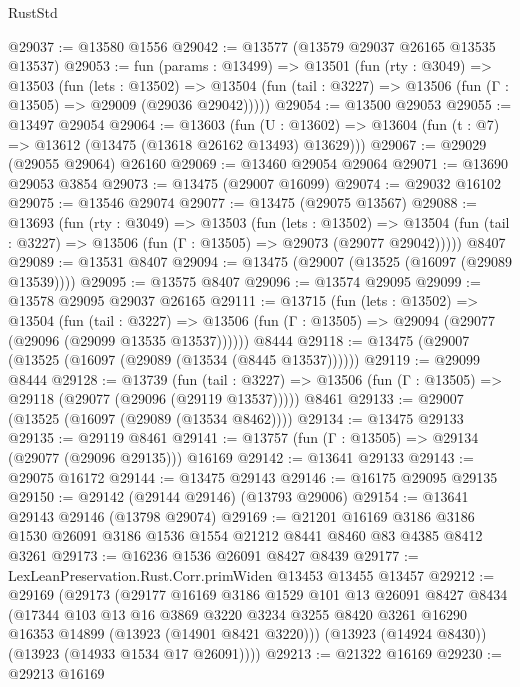 \begin{lexlean}{RustStd}
\begin{coremodule}
@29037 := @13580 @1556
@29042 := @13577 (@13579 @29037 @26165 @13535 @13537)
@29053 := fun (params : @13499) =>
  @13501
    (fun (rty : @3049) =>
    @13503
      (fun (lets : @13502) =>
      @13504 (fun (tail : @3227) => @13506 (fun (Γ : @13505) => @29009 (@29036 @29042)))))
@29054 := @13500 @29053
@29055 := @13497 @29054
@29064 := @13603
    (fun (U : @13602) => @13604 (fun (t : @7) => @13612 (@13475 (@13618 @26162 @13493) @13629)))
@29067 := @29029 (@29055 @29064) @26160
@29069 := @13460 @29054 @29064
@29071 := @13690 @29053 @3854
@29073 := @13475 (@29007 @16099)
@29074 := @29032 @16102
@29075 := @13546 @29074
@29077 := @13475 (@29075 @13567)
@29088 := @13693
    (fun (rty : @3049) =>
    @13503
      (fun (lets : @13502) =>
      @13504 (fun (tail : @3227) => @13506 (fun (Γ : @13505) => @29073 (@29077 @29042)))))
    @8407
@29089 := @13531 @8407
@29094 := @13475 (@29007 (@13525 (@16097 (@29089 @13539))))
@29095 := @13575 @8407
@29096 := @13574 @29095
@29099 := @13578 @29095 @29037 @26165
@29111 := @13715
    (fun (lets : @13502) =>
    @13504
      (fun (tail : @3227) =>
      @13506 (fun (Γ : @13505) => @29094 (@29077 (@29096 (@29099 @13535 @13537))))))
    @8444
@29118 := @13475 (@29007 (@13525 (@16097 (@29089 (@13534 (@8445 @13537))))))
@29119 := @29099 @8444
@29128 := @13739
    (fun (tail : @3227) => @13506 (fun (Γ : @13505) => @29118 (@29077 (@29096 (@29119 @13537)))))
    @8461
@29133 := @29007 (@13525 (@16097 (@29089 (@13534 @8462))))
@29134 := @13475 @29133
@29135 := @29119 @8461
@29141 := @13757 (fun (Γ : @13505) => @29134 (@29077 (@29096 @29135))) @16169
@29142 := @13641 @29133
@29143 := @29075 @16172
@29144 := @13475 @29143
@29146 := @16175 @29095 @29135
@29150 := @29142 (@29144 @29146) (@13793 @29006)
@29154 := @13641 @29143 @29146 (@13798 @29074)
@29169 := @21201
    @16169
    @3186
    @3186
    @1530
    @26091
    @3186
    @1536
    @1554
    @21212
    @8441
    @8460
    @83
    @4385
    @8412
    @3261
@29173 := @16236 @1536 @26091 @8427 @8439
@29177 := LexLeanPreservation.Rust.Corr.primWiden @13453 @13455 @13457
@29212 := @29169
    (@29173
      (@29177
        @16169
        @3186
        @1529
        @101
        @13
        @26091
        @8427
        @8434
        (@17344
          @103
          @13
          @16
          @3869
          @3220
          @3234
          @3255
          @8420
          @3261
          @16290
          @16353
          @14899
          (@13923 (@14901 @8421 @3220)))
        (@13923 (@14924 @8430))
        (@13923 (@14933 @1534 @17 @26091))))
@29213 := @21322 @16169
@29230 := @29213
    @16169

\end{coremodule}
\end{lexlean}
